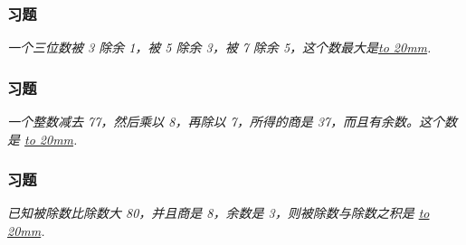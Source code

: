 \begin{frame}
    \frametitle{习题\theframecounter}
    
    \textit{一个三位数被 3 除余 1，被 5 除余 3，被 7 除余 5，这个数最大是\underline{\hbox to 20mm{}}.} %
\end{frame}

\begin{frame}
    \frametitle{习题\theframecounter}
    
    \textit{一个整数减去 77，然后乘以 8，再除以 7，所得的商是 37，而且有余数。这个数是 \underline{\hbox to 20mm{}}.} %
\end{frame}

\begin{frame}
    \frametitle{习题\theframecounter}
    
    \textit{已知被除数比除数大 80，并且商是 8，余数是 3，则被除数与除数之积是 \underline{\hbox to 20mm{}}.} %
\end{frame}


